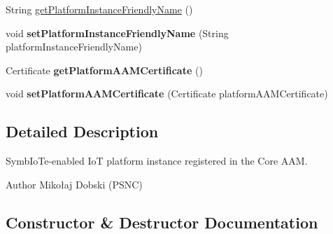 \begin{DoxyCompactItemize}
\item 
String \hyperlink{classeu_1_1h2020_1_1symbiote_1_1security_1_1commons_1_1Platform_affb694b25f23a3e51ed954ef1cbee285}{get\+Platform\+Instance\+Friendly\+Name} ()
\item 
void {\bfseries set\+Platform\+Instance\+Friendly\+Name} (String platform\+Instance\+Friendly\+Name)\hypertarget{classeu_1_1h2020_1_1symbiote_1_1security_1_1commons_1_1Platform_aa638ef51e567eb7eef993f06202a703a}{}\label{classeu_1_1h2020_1_1symbiote_1_1security_1_1commons_1_1Platform_aa638ef51e567eb7eef993f06202a703a}

\item 
Certificate {\bfseries get\+Platform\+A\+A\+M\+Certificate} ()\hypertarget{classeu_1_1h2020_1_1symbiote_1_1security_1_1commons_1_1Platform_aa6fc0d1badb106432e26ea90f94ee9b5}{}\label{classeu_1_1h2020_1_1symbiote_1_1security_1_1commons_1_1Platform_aa6fc0d1badb106432e26ea90f94ee9b5}

\item 
void {\bfseries set\+Platform\+A\+A\+M\+Certificate} (Certificate platform\+A\+A\+M\+Certificate)\hypertarget{classeu_1_1h2020_1_1symbiote_1_1security_1_1commons_1_1Platform_addc0ccf19ee9e9ffd009184981aca2c6}{}\label{classeu_1_1h2020_1_1symbiote_1_1security_1_1commons_1_1Platform_addc0ccf19ee9e9ffd009184981aca2c6}

\end{DoxyCompactItemize}


\subsection{Detailed Description}
Symb\+Io\+Te-\/enabled IoT platform instance registered in the Core A\+AM.

\begin{DoxyAuthor}{Author}
Mikołaj Dobski (P\+S\+NC) 
\end{DoxyAuthor}


\subsection{Constructor \& Destructor Documentation}
